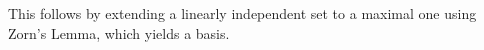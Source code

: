 This follows by extending a linearly independent set to a maximal one using Zorn's Lemma,
which yields a basis.
